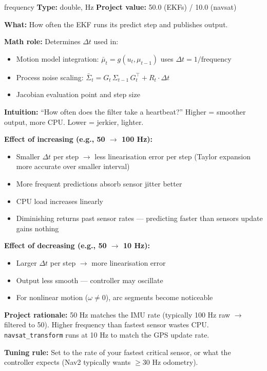 \documentclass[11pt,a4paper]{article}
\begin{document}
\begin{paramcard}{frequency}
\textbf{Type:} double, Hz \quad \textbf{Project value:} 50.0 (EKFs) / 10.0 (navsat)

\textbf{What:} How often the EKF runs its predict step and publishes output.

\textbf{Math role:} Determines $\Delta t$ used in:
\begin{itemize}
\item Motion model integration: $\bar{\mu}_t = g(u_t, \mu_{t-1})$ uses $\Delta t = 1/\text{frequency}$
\item Process noise scaling: $\bar{\Sigma}_t = G_t\, \Sigma_{t-1}\, G_t^\top + R_t \cdot \Delta t$
\item Jacobian evaluation point and step size
\end{itemize}

\textbf{Intuition:} ``How often does the filter take a heartbeat?'' Higher = smoother output, more CPU. Lower = jerkier, lighter.

\textbf{Effect of increasing (e.g., 50 $\to$ 100 Hz):}
\begin{itemize}
\item Smaller $\Delta t$ per step $\to$ less linearisation error per step (Taylor expansion more accurate over smaller interval)
\item More frequent predictions absorb sensor jitter better
\item CPU load increases linearly
\item Diminishing returns past sensor rates --- predicting faster than sensors update gains nothing
\end{itemize}

\textbf{Effect of decreasing (e.g., 50 $\to$ 10 Hz):}
\begin{itemize}
\item Larger $\Delta t$ per step $\to$ more linearisation error
\item Output less smooth --- controller may oscillate
\item For nonlinear motion ($\omega \neq 0$), arc segments become noticeable
\end{itemize}

\textbf{Project rationale:} 50 Hz matches the IMU rate (typically 100 Hz raw $\to$ filtered to 50). Higher frequency than fastest sensor wastes CPU. \texttt{navsat\_transform} runs at 10 Hz to match the GPS update rate.

\textbf{Tuning rule:} Set to the rate of your fastest critical sensor, or what the controller expects (Nav2 typically wants $\geq 30$ Hz odometry).
\end{paramcard}
\end{document}
